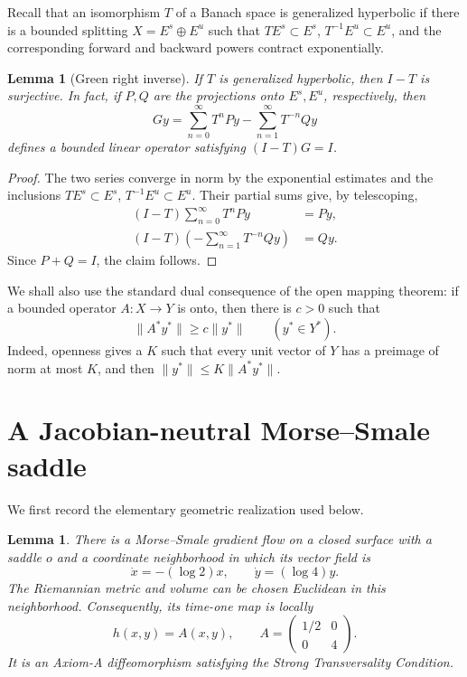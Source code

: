 \documentclass[11pt]{article}
\newtheorem{lemma}[theorem]{Lemma}
\begin{document}
Recall that an isomorphism $T$ of a Banach space is generalized hyperbolic if
there is a bounded splitting $X=E^s\oplus E^u$ such that
$TE^s\subset E^s$, $T^{-1}E^u\subset E^u$, and the corresponding forward and
backward powers contract exponentially.

\begin{lemma}[Green right inverse]\label{lem:green}
If $T$ is generalized hyperbolic, then $I-T$ is surjective.  In fact, if
$P,Q$ are the projections onto $E^s,E^u$, respectively, then
\begin{equation}
 Gy=\sum_{n=0}^{\infty}T^nPy-\sum_{n=1}^{\infty}T^{-n}Qy
 \label{eq:green}
\end{equation}
defines a bounded linear operator satisfying $(I-T)G=I$.
\end{lemma}

\begin{proof}
The two series converge in norm by the exponential estimates and the
inclusions $TE^s\subset E^s$, $T^{-1}E^u\subset E^u$.  Their partial sums
give, by telescoping,
\begin{align*}
 (I-T)\sum_{n=0}^{\infty}T^nPy&=Py,\\
 (I-T)\left(-\sum_{n=1}^{\infty}T^{-n}Qy\right)&=Qy.
\end{align*}
Since $P+Q=I$, the claim follows.
\end{proof}

We shall also use the standard dual consequence of the open mapping theorem:
if a bounded operator $A\colon X\to Y$ is onto, then there is $c>0$ such that
\begin{equation}
 \|A^*y^*\|\geq c\|y^*\|\qquad(y^*\in Y^*).
 \label{eq:adjoint-below}
\end{equation}
Indeed, openness gives a $K$ such that every unit vector of $Y$ has a
preimage of norm at most $K$, and then
$\|y^*\|\leq K\|A^*y^*\|$.

\section{A Jacobian-neutral Morse--Smale saddle}

We first record the elementary geometric realization used below.

\begin{lemma}\label{lem:realization}
There is a Morse--Smale gradient flow on a closed surface with a saddle $o$
and a coordinate neighborhood in which its vector field is
\[
  \dot x=-(\log2)x,\qquad \dot y=(\log4)y.
\]
The Riemannian metric and volume can be chosen Euclidean in this neighborhood.
Consequently, its time-one map is locally
\begin{equation}
  h(x,y)=A(x,y),\qquad
  A=\begin{pmatrix}1/2&0\\0&4\end{pmatrix}.
  \label{eq:localA}
\end{equation}
It is an Axiom-A diffeomorphism satisfying the Strong Transversality
Condition.
\end{lemma}
\end{document}
